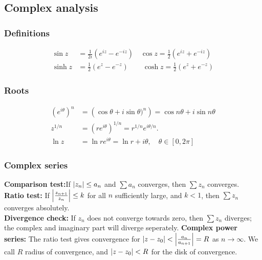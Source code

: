 \documentclass[a4paper, 10pt]{article}
\begin{document}
\tiny
\begin{multicols*}{3}
\begin{mdframed}
\subsection*{Complex analysis}
\end{mdframed}
\subsubsection*{Definitions}
\begin{align*}
  \sin{z} &= \frac{1}{2i}\left(e^{iz}-e^{-iz}\right)\quad
  \cos{z} = \frac{1}{2}\left(e^{iz}+e^{-iz}\right)\\
  \sinh{z} &= \frac{1}{2}\left(e^{z}-e^{-z}\right)\qquad
  \cosh{z} = \frac{1}{2}\left(e^{z}+e^{-z}\right)
\end{align*}

\subsubsection*{Roots}
\begin{align*}
  \left(e^{i\theta}\right)^n &= \left(\cos{\theta} + i \sin{\theta})^n\right) = \cos{n\theta} + i\sin{n\theta}\\
  z^{1/n} &= \left(re^{i\theta}\right)^{1/n} = r^{1/n}e^{i\theta/n}.\\
  \ln{z} &= \ln{re^{i\theta}} = \ln{r} + i\theta, \quad \theta \in [0, 2\pi]
\end{align*}


\subsubsection*{Complex series}
\textbf{Comparison test:}If $\abs{z_n} \leq a_n$ and $\sum a_n$ converges, then $\sum z_n$ converges.\\
\textbf{Ratio test:} If $\abs{\frac{z_{n+1}}{z_n}} \leq k$ for all $n$ sufficiently large, and $k<1$, then $\sum z_n$ converges absolutely.\\
\textbf{Divergence check:} If $z_n$ does not converge towards zero, then $\sum z_n$ diverges; the complex and imaginary part will diverge seperately.
\textbf{Complex power series:} The ratio test gives convergence for $\abs{z-z_0} < \abs{\frac{a_n}{a_{n+1}}} = R$ as $n\rightarrow \infty$. We call $R$ radius of convergence, and $\abs{z-z_0} < R$ for the disk of convergence.


\end{multicols*}
\end{document}
